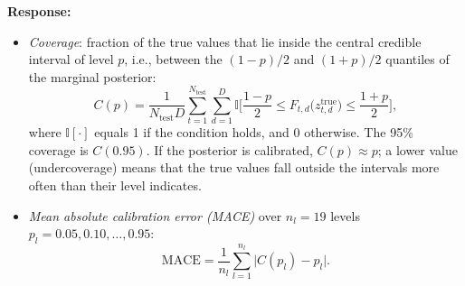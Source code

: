 \documentclass[11pt]{article}
\newenvironment{response}{\par\smallskip\noindent\color{resp}\textbf{Response:}\ }{\par}
\begin{document}
\begin{response}
\begin{itemize}[leftmargin=*]
	\begin{equation}
		\mathrm{ALL}=\frac{1}{N_{\text{test}}D}\sum_{t=1}^{N_{\text{test}}}\sum_{d=1}^{D}\log q_{t,d}\big(z^{\text{true}}_{t,d}\big).
		\label{eq:all}
	\end{equation}
	\item \emph{Coverage}: fraction of the true values that lie inside the central credible interval of level $p$, i.e.,
	between the $(1-p)/2$ and $(1+p)/2$ quantiles of the marginal posterior:
	\begin{equation}
		C(p)=\frac{1}{N_{\text{test}}D}\sum_{t=1}^{N_{\text{test}}}\sum_{d=1}^{D}\mathbb{I}\Big[\frac{1-p}{2}\le F_{t,d}\big(z^{\text{true}}_{t,d}\big)\le\frac{1+p}{2}\Big],
		\label{eq:coverage}
	\end{equation}
	where $\mathbb{I}[\cdot]$ equals 1 if the condition holds, and 0 otherwise. The 95\% coverage is $C(0.95)$. If the
	posterior is calibrated, $C(p)\approx p$; a lower value (undercoverage) means that the true values fall outside the
	intervals more often than their level indicates.
	\item \emph{Mean absolute calibration error (MACE)} over $n_l=19$ levels $p_l=0.05,0.10,\dots,0.95$:
	\begin{equation}
		\mathrm{MACE}=\frac{1}{n_l}\sum_{l=1}^{n_l}\big|C(p_l)-p_l\big|.
		\label{eq:mace}
	\end{equation}
\end{itemize}


\end{response}
\end{document}
